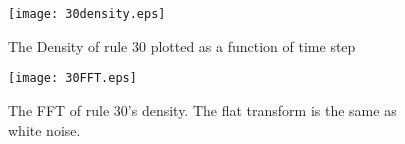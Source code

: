\begin{figure}
    \begin{minipage}[b]{0.49\textwidth}
        \centering
        \texttt{[image: 30density.eps]}
        \caption{\label{30density} The Density of rule 30 plotted as a function of time step}
    \end{minipage}
    \hspace{0.5cm}
    \begin{minipage}[b]{0.49\textwidth}
        \centering
        \texttt{[image: 30FFT.eps]}
        \caption{\label{30FFT} The FFT of rule 30's density.  The flat transform is the same as white noise.}
    \end{minipage}
\end{figure}
